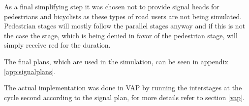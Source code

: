 As a final simplifying step it was chosen not to provide signal heads for pedestrians and bicyclists as these types of road users are not being simulated. Pedestrian stages will mostly follow the parallel stages anyway and if this is not the case the stage, which is being denied in favor of the pedestrian stage, will simply receive red for the duration.

The final plans, which are used in the simulation, can be seen in appendix \ref{app:signalplans}.

The actual implementation was done in VAP by running the interstages at the cycle second according to the signal plan, for more details refer to section \ref{vap}.

